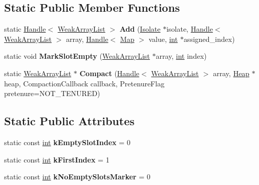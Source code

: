 \subsection*{Static Public Member Functions}
\begin{DoxyCompactItemize}
\item 
\mbox{\label{classv8_1_1internal_1_1PrototypeUsers_ac1e151b7fc464f67325bd35e554f5234}} 
static \mbox{\hyperlink{classv8_1_1internal_1_1Handle}{Handle}}$<$ \mbox{\hyperlink{classv8_1_1internal_1_1WeakArrayList}{Weak\+Array\+List}} $>$ {\bfseries Add} (\mbox{\hyperlink{classv8_1_1internal_1_1Isolate}{Isolate}} $\ast$isolate, \mbox{\hyperlink{classv8_1_1internal_1_1Handle}{Handle}}$<$ \mbox{\hyperlink{classv8_1_1internal_1_1WeakArrayList}{Weak\+Array\+List}} $>$ array, \mbox{\hyperlink{classv8_1_1internal_1_1Handle}{Handle}}$<$ \mbox{\hyperlink{classv8_1_1internal_1_1Map}{Map}} $>$ value, \mbox{\hyperlink{classint}{int}} $\ast$assigned\+\_\+index)
\item 
\mbox{\label{classv8_1_1internal_1_1PrototypeUsers_ad933d7f100fc6c5b3c249ac6ec56339f}} 
static void {\bfseries Mark\+Slot\+Empty} (\mbox{\hyperlink{classv8_1_1internal_1_1WeakArrayList}{Weak\+Array\+List}} $\ast$array, \mbox{\hyperlink{classint}{int}} index)
\item 
\mbox{\label{classv8_1_1internal_1_1PrototypeUsers_a6a004cfa647743b419dd93b71baf9163}} 
static \mbox{\hyperlink{classv8_1_1internal_1_1WeakArrayList}{Weak\+Array\+List}} $\ast$ {\bfseries Compact} (\mbox{\hyperlink{classv8_1_1internal_1_1Handle}{Handle}}$<$ \mbox{\hyperlink{classv8_1_1internal_1_1WeakArrayList}{Weak\+Array\+List}} $>$ array, \mbox{\hyperlink{classv8_1_1internal_1_1Heap}{Heap}} $\ast$heap, Compaction\+Callback callback, Pretenure\+Flag pretenure=N\+O\+T\+\_\+\+T\+E\+N\+U\+R\+ED)
\end{DoxyCompactItemize}
\subsection*{Static Public Attributes}
\begin{DoxyCompactItemize}
\item 
\mbox{\label{classv8_1_1internal_1_1PrototypeUsers_ab18a5d183585030ee659baac1207cf93}} 
static const \mbox{\hyperlink{classint}{int}} {\bfseries k\+Empty\+Slot\+Index} = 0
\item 
\mbox{\label{classv8_1_1internal_1_1PrototypeUsers_abdd1fe7556befe7069e126ae36d624df}} 
static const \mbox{\hyperlink{classint}{int}} {\bfseries k\+First\+Index} = 1
\item 
\mbox{\label{classv8_1_1internal_1_1PrototypeUsers_ac11715090a75cb75698f638a884621d5}} 
static const \mbox{\hyperlink{classint}{int}} {\bfseries k\+No\+Empty\+Slots\+Marker} = 0
\end{DoxyCompactItemize}
